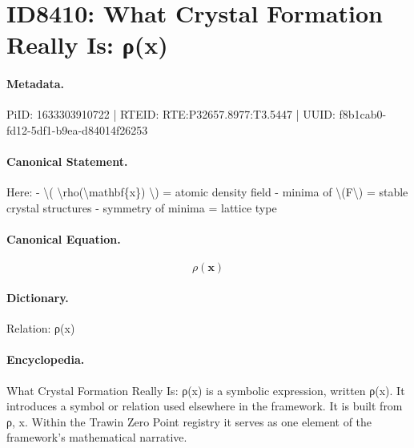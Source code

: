 \section*{ID8410: What Crystal Formation Really Is: ρ(x)}
\paragraph{Metadata.}
PiID: 1633303910722 | RTEID: RTE:P32657.8977:T3.5447 | UUID: f8b1cab0-fd12-5df1-b9ea-d84014f26253

\paragraph{Canonical Statement.}
Here: - \textbackslash{}( \textbackslash{}rho(\textbackslash{}mathbf\{x\}) \textbackslash{}) = atomic density field - minima of \textbackslash{}(F\textbackslash{}) = stable crystal structures - symmetry of minima = lattice type

\paragraph{Canonical Equation.}
\[
\rho(\mathbf{x})
\]

\paragraph{Dictionary.}
Relation: ρ(x)

\paragraph{Encyclopedia.}
What Crystal Formation Really Is: ρ(x) is a symbolic expression, written ρ(x). It introduces a symbol or relation used elsewhere in the framework. It is built from ρ, x. Within the Trawin Zero Point registry it serves as one element of the framework's mathematical narrative.
